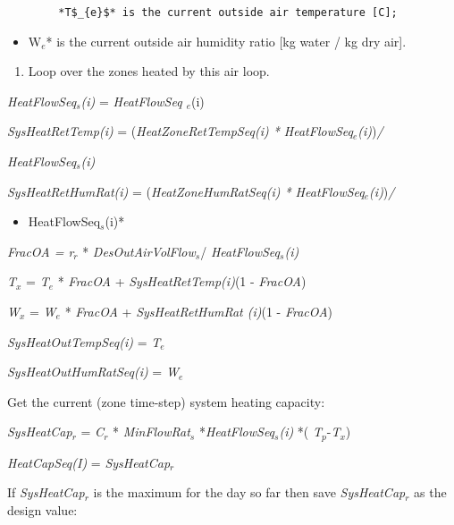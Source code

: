 \begin{lstlisting}
        *T$_{e}$* is the current outside air temperature [C];
\end{lstlisting}

\begin{itemize}
\tightlist
\item
  W\(_{e}\)* is the current outside air humidity ratio {[}kg water / kg dry air{]}.
\end{itemize}

\begin{enumerate}
\def\labelenumi{(\arabic{enumi})}
\setcounter{enumi}{1}
\tightlist
\item
  Loop over the zones heated by this air loop.
\end{enumerate}

\emph{HeatFlowSeq\(_{s}\)(i)} = \emph{HeatFlowSeq \(_{e}\)}(i)

\emph{SysHeatRetTemp(i)} = (\emph{HeatZoneRetTempSeq(i) * HeatFlowSeq\(_{e}\)(i)})\emph{/}

\emph{HeatFlowSeq\(_{s}\)(i)}

\emph{SysHeatRetHumRat(i)} = (\emph{HeatZoneHumRatSeq(i) * HeatFlowSeq\(_{e}\)(i)})\emph{/}

\begin{itemize}
\tightlist
\item
  HeatFlowSeq\(_{s}\)(i)*
\end{itemize}

\emph{FracOA = r\(_{r}\)} * \emph{DesOutAirVolFlow\(_{s}\)}/ \emph{HeatFlowSeq\(_{s}\)(i)}

\emph{T\(_{x}\)} = \emph{T\(_{e}\)} * \emph{FracOA} + \emph{SysHeatRetTemp(i)}(1 - \emph{FracOA})

\emph{W\(_{x}\)} = \emph{W\(_{e}\)} * \emph{FracOA} + \emph{SysHeatRetHumRat (i)}(1 - \emph{FracOA})

\emph{SysHeatOutTempSeq(i)} = \emph{T\(_{e}\)}

\emph{SysHeatOutHumRatSeq(i)} = \emph{W\(_{e}\)}

Get the current (zone time-step) system heating capacity:

\emph{SysHeatCap\(_{r}\)} = \emph{C\(_{r}\)} * \emph{MinFlowRat\(_{s}\)} *\emph{HeatFlowSeq\(_{s}\)(i)} *( \emph{T\(_{p}\)}-\emph{T\(_{x}\)})

\emph{HeatCapSeq(I)} = \emph{SysHeatCap\(_{r}\)}

If \emph{SysHeatCap\(_{r}\)} is the maximum for the day so far then save \emph{SysHeatCap\(_{r}\)} as the design value:

